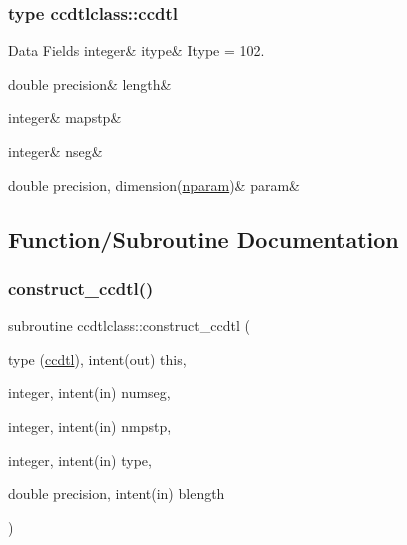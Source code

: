 \subsubsection{type ccdtlclass\+::ccdtl}
\begin{DoxyFields}{Data Fields}
\mbox{\label{namespaceccdtlclass_aea542f9975283b5fd43c8f15a0d2762f}} 
integer&
itype&
Itype = 102. \\
\hline

\mbox{\label{namespaceccdtlclass_a367acb3cd3326d78cf47fe5c8891b80c}} 
double precision&
length&
\\
\hline

\mbox{\label{namespaceccdtlclass_a646c337f17e8c188638d58449ea92b99}} 
integer&
mapstp&
\\
\hline

\mbox{\label{namespaceccdtlclass_a56759205b010998a69c2716e35e0d6d6}} 
integer&
nseg&
\\
\hline

\mbox{\label{namespaceccdtlclass_a6b125e6ca6440736ab2272ad373cc24d}} 
double precision, dimension(\mbox{\hyperlink{namespaceccdtlclass_a0e8e95c86f2dab6639fc79f05859b6ea}{nparam}})&
param&
\\
\hline

\end{DoxyFields}


\subsection{Function/\+Subroutine Documentation}
\mbox{\label{namespaceccdtlclass_aaa94d8179c6d59c2d3e81b64e8237962}} 
\subsubsection{\texorpdfstring{construct\_ccdtl()}{construct\_ccdtl()}}
{\footnotesize\ttfamily subroutine ccdtlclass\+::construct\+\_\+ccdtl (\begin{DoxyParamCaption}\item[{type (\mbox{\hyperlink{namespaceccdtlclass_structccdtlclass_1_1ccdtl}{ccdtl}}), intent(out)}]{this,  }\item[{integer, intent(in)}]{numseg,  }\item[{integer, intent(in)}]{nmpstp,  }\item[{integer, intent(in)}]{type,  }\item[{double precision, intent(in)}]{blength }\end{DoxyParamCaption})}

